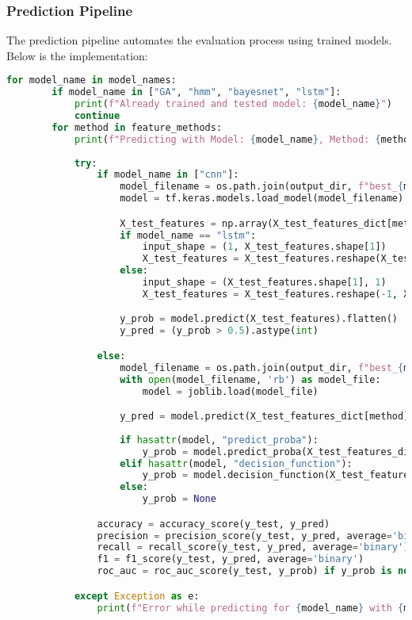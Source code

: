 \subsubsection{Prediction Pipeline}
The prediction pipeline automates the evaluation process using trained models. Below is the implementation:

\begin{lstlisting}[language=python,caption={Unified Prediction Pipeline},label={lst:predict}]
    for model_name in model_names:
        if model_name in ["GA", "hmm", "bayesnet", "lstm"]:
            print(f"Already trained and tested model: {model_name}")
            continue
        for method in feature_methods:
            print(f"Predicting with Model: {model_name}, Method: {method}...")
            
            try:
                if model_name in ["cnn"]:
                    model_filename = os.path.join(output_dir, f"best_{model_name}.keras")
                    model = tf.keras.models.load_model(model_filename)

                    X_test_features = np.array(X_test_features_dict[method])
                    if model_name == "lstm":
                        input_shape = (1, X_test_features.shape[1])
                        X_test_features = X_test_features.reshape(X_test_features.shape[0], *input_shape)
                    else:
                        input_shape = (X_test_features.shape[1], 1)
                        X_test_features = X_test_features.reshape(-1, X_test_features.shape[1], 1)

                    y_prob = model.predict(X_test_features).flatten()
                    y_pred = (y_prob > 0.5).astype(int)

                else: 
                    model_filename = os.path.join(output_dir, f"best_{model_name}_{method}.pkl")
                    with open(model_filename, 'rb') as model_file:
                        model = joblib.load(model_file)

                    y_pred = model.predict(X_test_features_dict[method])
                    
                    if hasattr(model, "predict_proba"):
                        y_prob = model.predict_proba(X_test_features_dict[method])[:, 1]  # Take the positive class probabilities
                    elif hasattr(model, "decision_function"):
                        y_prob = model.decision_function(X_test_features_dict[method])
                    else:
                        y_prob = None

                accuracy = accuracy_score(y_test, y_pred)
                precision = precision_score(y_test, y_pred, average='binary')
                recall = recall_score(y_test, y_pred, average='binary')
                f1 = f1_score(y_test, y_pred, average='binary')
                roc_auc = roc_auc_score(y_test, y_prob) if y_prob is not None else "N/A"

            except Exception as e:
                print(f"Error while predicting for {model_name} with {method}: {e}")
\end{lstlisting}

